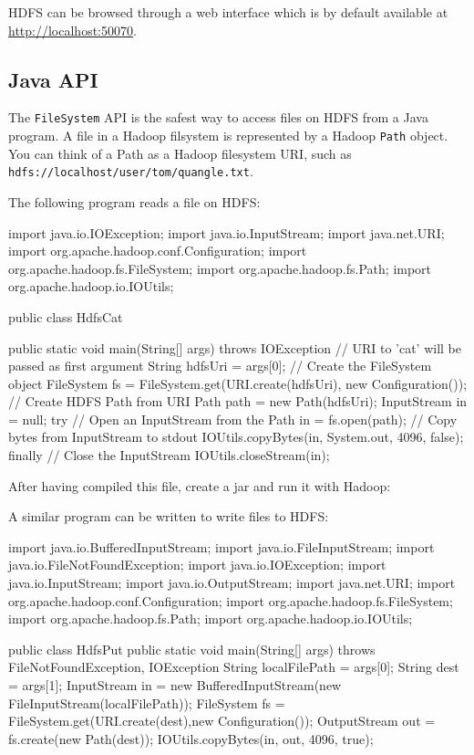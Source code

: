 \documentclass[11pt]{article}
\begin{document}
HDFS can be browsed through a web interface which is by default
available at \href{http://localhost:50070}{http://localhost:50070}.

\subsection{Java API}

The \texttt{FileSystem} API is the safest way to access files on HDFS
from a Java program. A file in a Hadoop filsystem is represented by a
Hadoop \texttt{Path} object. You can think of a Path as a Hadoop
filesystem URI, such as
\texttt{hdfs://localhost/user/tom/quangle.txt}.

The following program reads a file on HDFS:
\begin{java}
import java.io.IOException;
import java.io.InputStream;
import java.net.URI;
import org.apache.hadoop.conf.Configuration;
import org.apache.hadoop.fs.FileSystem;
import org.apache.hadoop.fs.Path;
import org.apache.hadoop.io.IOUtils;


public class HdfsCat {

    public static void main(String[] args) throws IOException {
        // URI to 'cat' will be passed as first argument
        String hdfsUri = args[0];
        // Create the FileSystem object
        FileSystem fs = FileSystem.get(URI.create(hdfsUri), new Configuration());
        // Create HDFS Path from URI
        Path path = new Path(hdfsUri);
        InputStream in = null;
        try{
            // Open an InputStream from the Path
            in = fs.open(path);
            // Copy bytes from InputStream to stdout
            IOUtils.copyBytes(in, System.out, 4096, false);
        } finally{
            // Close the InputStream
            IOUtils.closeStream(in);
        }
    }  
}
\end{java}
After having compiled this file, create a jar and run it with Hadoop:
A similar program can be written to write files to HDFS:
\begin{java}
import java.io.BufferedInputStream;
import java.io.FileInputStream;
import java.io.FileNotFoundException;
import java.io.IOException;
import java.io.InputStream;
import java.io.OutputStream;
import java.net.URI;
import org.apache.hadoop.conf.Configuration;
import org.apache.hadoop.fs.FileSystem;
import org.apache.hadoop.fs.Path;
import org.apache.hadoop.io.IOUtils;


public class HdfsPut {
  public static void main(String[] args) throws FileNotFoundException, IOException{
      String localFilePath = args[0];
      String dest = args[1];
      InputStream in = new BufferedInputStream(new FileInputStream(localFilePath));
      FileSystem fs = FileSystem.get(URI.create(dest),new Configuration());
      OutputStream out = fs.create(new Path(dest));
      IOUtils.copyBytes(in, out, 4096, true);
  }
}
\end{java}
\end{document}
